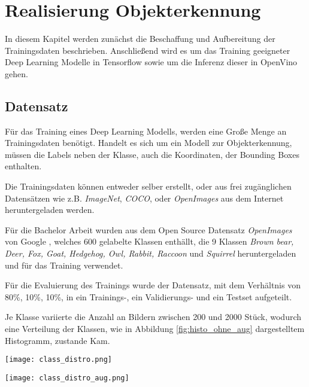 \chapter{Realisierung Objekterkennung}\label{kap:object_det}

In diesem Kapitel werden zunächst die Beschaffung und Aufbereitung 
der Trainingsdaten beschrieben. Anschließend wird es um das 
Training geeigneter Deep Learning Modelle in Tensorflow sowie 
um die Inferenz dieser in OpenVino gehen.

\section{Datensatz}\label{sec:dataset}

Für das Training eines Deep Learning Modells, werden 
eine Große Menge an Trainingsdaten benötigt.
Handelt es sich um ein Modell zur Objekterkennung,
müssen die Labels neben der Klasse, auch die Koordinaten, 
der Bounding Boxes enthalten.

Die Trainingsdaten können entweder selber erstellt, oder 
aus frei zugänglichen Datensätzen wie z.B. \textit{ImageNet}, 
\textit{COCO}, oder \textit{OpenImages}
aus dem Internet heruntergeladen werden.

Für die Bachelor Arbeit wurden aus dem Open Source Datensatz
\textit{OpenImages} von Google
\cite{kuznetsovaOpenImagesDataset2018}, 
welches 600 gelabelte Klassen enthällt, 
die 9 Klassen \textit{Brown bear, Deer, Fox, Goat, 
Hedgehog, Owl, Rabbit, Raccoon} und \textit{Squirrel}
heruntergeladen und für das Training verwendet.

Für die Evaluierung des Trainings wurde der 
Datensatz, mit dem Verhältnis von 80\%, 10\%, 10\%, in ein
Trainings-, ein Validierungs- und ein 
Testset aufgeteilt.

Je Klasse variierte die Anzahl an Bildern zwischen 200 und 
2000 Stück, wodurch eine Verteilung der Klassen, 
wie in  Abbildung \ref{fig:histo_ohne_aug} dargestelltem Histogramm,
zustande Kam.


\vspace{1cm}
\begin{minipage}{0.5\textwidth}
    \centering
    \texttt{[image: class\_distro.png]}
    \label{fig:histo_ohne_aug}
\end{minipage}
\begin{minipage}{0.5\textwidth}
    \centering
    \texttt{[image: class\_distro\_aug.png]}
    \label{fig:histo_mit_aug}
\end{minipage}
\vspace{1cm}

